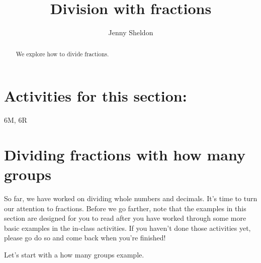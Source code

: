 \documentclass{ximera}
\title{Division with fractions}
\author{Jenny Sheldon}
\begin{document}
\begin{abstract}
We explore how to divide fractions.
\end{abstract}
\maketitle

\section{Activities for this section:} 6M, 6R

\section{Dividing fractions with how many groups}

So far, we have worked on dividing whole numbers and decimals. It's time to turn our attention to fractions. Before we go farther, note that the examples in this section are designed for you to read after you have worked through some more basic examples in the in-class activities. If you haven't done those activities yet, please go do so and come back when you're finished! 

Let's start with a how many groups example. 
\end{document}
